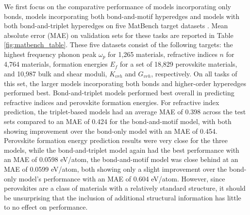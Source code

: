 \documentclass[twoside,twocolumn,9pt]{article}
\begin{document}
We first focus on the comparative performance of models incorporating only bonds, models incorporating both bond-and-motif hyperedges and models with both bond-and-triplet hyperedges on five MatBench target datasets \cite{matbench}. Mean absolute error (MAE) on validation sets for these tasks are reported in Table \ref{fig:matbench_table}. These five datasets consist of the following targets: the highest frequency phonon peak $\omega_p$ for 1,265 materials, refractive indices $n$ for 4,764 materials, formation energies $E_f$ for a set of 18,829 perovskite materials, and 10,987 bulk and shear moduli, $K_{vrh}$ and $G_{vrh}$, respectively.
On all tasks of this set, the larger models incorporating both bonds and higher-order hyperedges performed best. 
Bond-and-triplet models performed best overall in predicting refractive indices and perovskite formation energies. For refractive index prediction, the triplet-based models had an average MAE of 0.398 across the test sets compared to an MAE of 0.424 for the bond-and-motif model, with both showing improvement over the bond-only model with an MAE of 0.454. Perovskite formation energy prediction results were very close for the three models, while the bond-and-triplet model again had the best performance with an MAE of 0.0598 eV/atom, the bond-and-motif model was close behind at an MAE of 0.0599 eV/atom, both showing only a slight improvement over the bond-only model's performance with an MAE of 0.604 eV/atom. However, since perovskites are a class of materials with a relatively standard structure, it should be unsurprising that the inclusion of additional structural information has little to no effect on performance.




\end{document}
